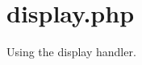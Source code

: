 \hypertarget{display_8php-example}{
\section{display.php}
}
Using the display handler.


\begin{DoxyCodeInclude}
\end{DoxyCodeInclude}
 